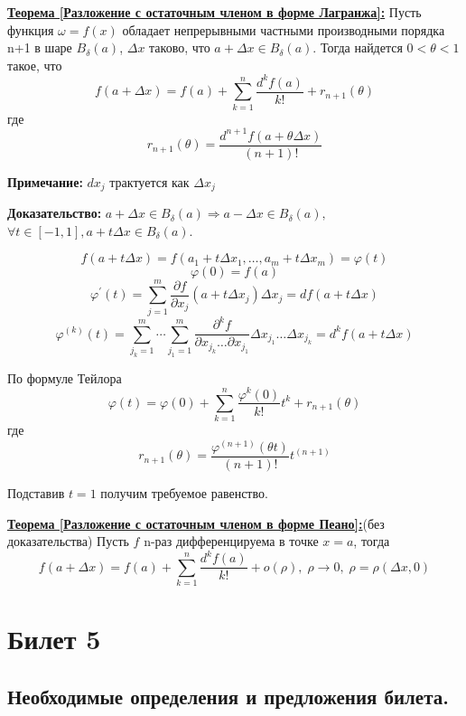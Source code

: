 \documentclass[a4paper,12pt]{article} %
\begin{document}
\underline{\textbf{Теорема [Разложение с остаточным членом в форме Лагранжа]:}} Пусть функция $\omega = f(x)$ обладает непрерывными частными производными порядка n+1 в шаре $B_\delta(a)$, $\Delta x$ таково, что $a+\Delta x\in B_\delta(a)$. Тогда найдется $0<\theta<1$ такое, что 
\[
	f(a+\Delta x) = f(a) + \sum\limits_{k=1}^n\frac{d^k f(a)}{k!}+r_{n+1}(\theta)
\]
где
\[
	r_{n+1}(\theta) = \frac{d^{n+1}f(a+\theta \Delta x)}{(n+1)!}
\]

\textbf{Примечание:} $dx_j$ трактуется как $\Delta x_j$
\vspace{5mm}

\textbf{Доказательство:} $a+\Delta x\in B_\delta(a) \Rightarrow a-\Delta x\in B_\delta(a), $ $\forall t\in[-1, 1], a+t\Delta x\in B_\delta(a)$.

\[
	f(a + t\Delta x) = f(a_1 + t\Delta x_1, \dots, a_m + t\Delta x_m) = \varphi(t)
\]
\[
	\varphi(0) = f(a)
\]
\[
	\varphi^{'}(t) = \sum\limits_{j=1}^m \frac{\partial f}{\partial x_j}(a+t\Delta x_j)\Delta x_j = df(a+t\Delta x)
\]
\[
	\varphi^{(k)}(t) = \sum\limits_{j_k=1}^m\cdots\sum\limits_{j_1=1}^m\frac{\partial^kf}{\partial x_{j_k}\dots\partial x_{j_1}}\Delta x_{j_1}\dots \Delta x_{j_k} = d^kf(a+t\Delta x)
\]

По формуле Тейлора
\[
	\varphi(t) = \varphi(0) +\sum\limits_{k=1}^n\frac{\varphi^k(0)}{k!}t^k + r_{n+1}(\theta)
\]
где
\[
	r_{n+1}(\theta) = \frac{\varphi^{(n+1)}(\theta t)}{(n+1)!}t^{(n+1)}
\]

Подставив $t=1$ получим требуемое равенство.
\vspace{5mm}

\underline{\textbf{Теорема [Разложение с остаточным членом в форме Пеано]:}}(без доказательства) Пусть $f$ n-раз дифференцируема в точке $x =a$, тогда
\[
	f(a+\Delta x) = f(a) + \sum\limits_{k=1}^n\frac{d^kf(a)}{k!}+o(\rho),  \; \rho\to 0, \; \rho =  \rho(\Delta x, 0)
\]


\newpage
\section{Билет 5}

\subsection{Необходимые определения и предложения билета.}
\end{document}
